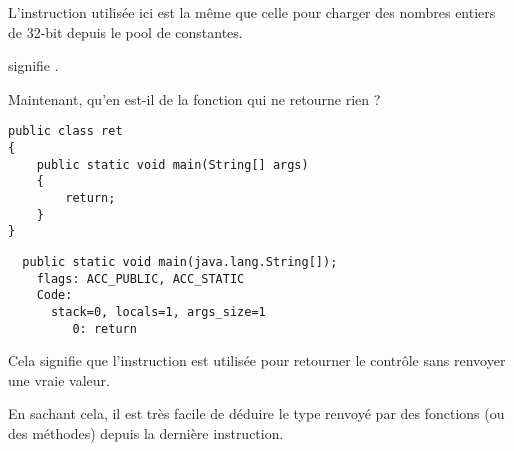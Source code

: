 L'instruction  utilisée ici est la même que celle pour charger des nombres entiers de 32-bit
depuis le pool de constantes.

 signifie .

Maintenant, qu'en est-il de la fonction qui ne retourne rien ?

\begin{lstlisting}[style=customjava]
public class ret
{
	public static void main(String[] args) 
	{
		return;
	}
}
\end{lstlisting}

\begin{lstlisting}
  public static void main(java.lang.String[]);
    flags: ACC_PUBLIC, ACC_STATIC
    Code:
      stack=0, locals=1, args_size=1
         0: return        
\end{lstlisting}

Cela signifie que l'instruction  est utilisée pour retourner le contrôle sans renvoyer
une vraie valeur.

En sachant cela, il est très facile de déduire le type renvoyé par des fonctions (ou des méthodes) depuis la dernière instruction.

